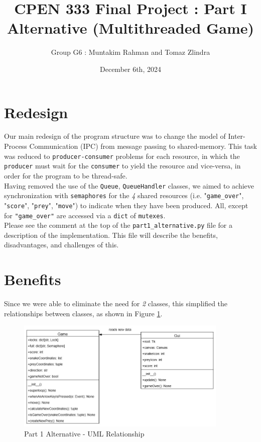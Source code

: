 \documentclass{article}
\title{CPEN 333 Final Project : Part I Alternative (Multithreaded Game)}
\author{Group G6 : Muntakim Rahman and Tomaz Zlindra}
\date{December 6th, 2024}
\begin{document}
\maketitle

\section{Redesign}
Our main redesign of the program structure was to change the model of Inter-Process Communication (IPC) from message passing to shared-memory.
This task was reduced to \texttt{producer-consumer} problems for each resource, in which the \texttt{producer} must wait for the \texttt{consumer} to yield the resource and vice-versa,
in order for the program to be thread-safe. \\

Having removed the use of the \texttt{Queue}, \texttt{QueueHandler} classes, we aimed to achieve synchronization with \texttt{semaphores} for
the \textit{4} shared resources (i.e. "\texttt{game\_over}", "\texttt{score}", "\texttt{prey}", "\texttt{move}") to indicate when they have been produced. All, except for \texttt{"game\_over"}
are accessed via a \texttt{dict} of \texttt{mutexes}. \\

Please see the comment at the top of the \texttt{part1\_alternative.py} file for a description of the implementation. This file will describe the benefits, disadvantages, and challenges of this.

\section{Benefits}

Since we were able to eliminate the need for \textit{2} classes, this simplified the relationships between classes, as shown in Figure \ref{fig:Part1_Alternative_ClassDiagrams}. \\

\begin{figure}[H]
    \centering
    \includegraphics[width=0.9\textwidth]{../Part_1_Alternative_ClassDiagrams.jpg}
    \caption{Part 1 Alternative - UML Relationship}
    \label{fig:Part1_Alternative_ClassDiagrams}
\end{figure}
\end{document}
